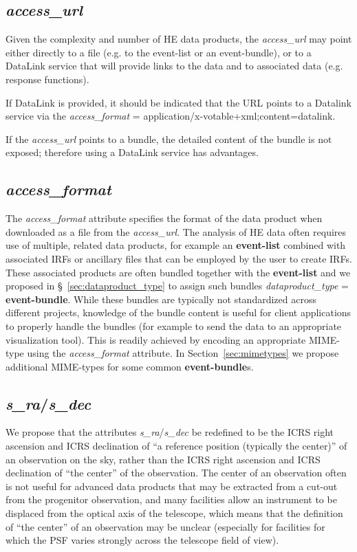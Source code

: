 \documentclass[11pt,a4paper]{ivoa}
\begin{document}
\subsection{{\em access\_url}}

Given the complexity and number of HE data products, the {\em access\_url} may point either directly to a file (e.g. to the event-list or an event-bundle), or to a DataLink service that will provide links to the data and to associated data (e.g. response functions).

If DataLink is provided, it should be indicated that the URL points to a Datalink service via the {\em access\_format} = application/x-votable+xml;content=datalink.

If the {\em access\_url} points to a bundle, the detailed content of the bundle is not exposed; therefore using a DataLink service has advantages.


\subsection{{\em access\_format}}

The {\em access\_format\/} attribute specifies the format of the data product when downloaded as a file from the {\em access\_url\/}.  The analysis of HE data often requires use of multiple, related data products, for example an {\bf event-list} combined with associated IRFs or ancillary files that can be employed by the user to create IRFs.  These associated products are often bundled together with the {\bf event-list} and we proposed in \S~\ref{sec:dataproduct_type} to assign such bundles {\em dataproduct\_type\/} = {\bf event-bundle}.  While these bundles are typically not standardized across different projects, knowledge of the bundle content is useful for client applications to properly handle the bundles (for example to send the data to an appropriate visualization tool).  This is readily achieved by encoding an appropriate MIME-type using the {\em access\_format\/} attribute.  In Section~\ref{sec:mimetypes} we propose additional MIME-types for some common {\bf event-bundle}s.

\subsection{{\em s\_ra\/}/{\em s\_dec}}

We propose that the attributes {\em s\_ra\/}/{\em s\_dec} be redefined to be the ICRS right ascension and ICRS declination of ``a reference position (typically the center)'' of an observation on the sky, rather than the ICRS right ascension and ICRS declination of ``the center'' of the observation.  The center of an observation often is not useful for advanced data products that may be extracted from a cut-out from the progenitor observation, and many facilities allow an instrument to be displaced from the optical axis of the telescope, which means that the definition of ``the center'' of an observation may be unclear (especially for facilities for which the PSF varies strongly across the telescope field of view).
\end{document}
